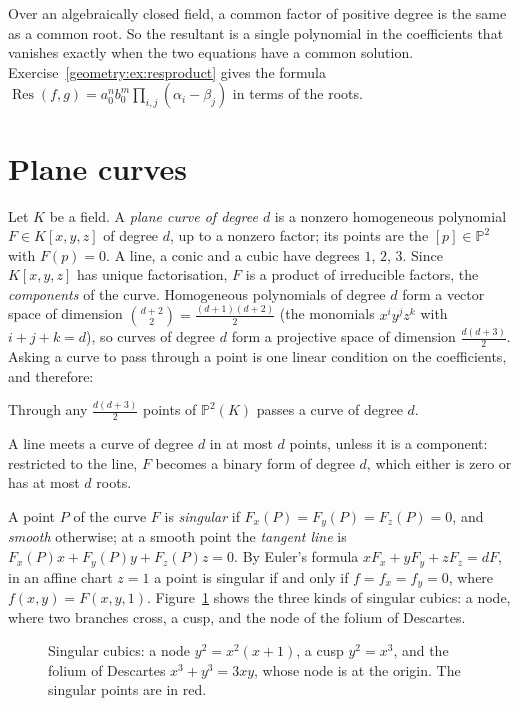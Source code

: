Over an algebraically closed field, a common factor of positive degree is the same as a common root. So the resultant is a single polynomial in the
coefficients that vanishes exactly when the two equations have a common solution. Exercise~\ref{geometry:ex:resproduct} gives the formula
$\operatorname{Res}(f,g)=a_0^nb_0^m\prod_{i,j}(\alpha_i-\beta_j)$ in terms of the roots.

\section{Plane curves}

Let $K$ be a field. A \emph{plane curve of degree $d$} is a nonzero homogeneous polynomial $F\in K[x,y,z]$ of degree $d$, up to a nonzero factor; its
points are the $[p]\in\mathbb P^2$ with $F(p)=0$. A line, a conic and a cubic have degrees $1$, $2$, $3$. Since $K[x,y,z]$ has unique factorisation,
$F$ is a product of irreducible factors, the \emph{components} of the curve. Homogeneous polynomials of degree $d$ form a vector space of dimension
$\binom{d+2}2=\frac{(d+1)(d+2)}2$ (the monomials $x^iy^jz^k$ with $i+j+k=d$), so curves of degree $d$ form a projective space of dimension
$\frac{d(d+3)}2$. Asking a curve to pass through a point is one linear condition on the coefficients, and therefore:

\begin{proposition}\label{geometry:prop:dimcurves}
Through any $\frac{d(d+3)}2$ points of $\mathbb P^2(K)$ passes a curve of degree $d$.
\end{proposition}

A line meets a curve of degree $d$ in at most $d$ points, unless it is a component: restricted to the line, $F$ becomes a binary form of degree $d$, which
either is zero or has at most $d$ roots.

A point $P$ of the curve $F$ is \emph{singular} if $F_x(P)=F_y(P)=F_z(P)=0$, and \emph{smooth} otherwise; at a smooth point the \emph{tangent line} is
$F_x(P)x+F_y(P)y+F_z(P)z=0$. By Euler's formula $xF_x+yF_y+zF_z=dF$, in an affine chart $z=1$ a point is singular if and only if $f=f_x=f_y=0$, where
$f(x,y)=F(x,y,1)$. Figure~\ref{geometry:fig:singular} shows the three kinds of singular cubics: a node, where two branches cross, a cusp, and the node of the folium of
Descartes.

\begin{figure}[ht]
\centering
{}
\caption{Singular cubics: a node $y^2=x^2(x+1)$, a cusp $y^2=x^3$, and the folium of Descartes $x^3+y^3=3xy$, whose node is at the origin. The singular
points are in red.}
\label{geometry:fig:singular}
\end{figure}

